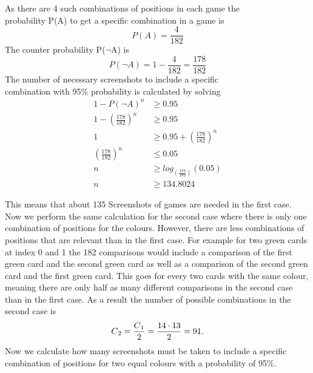 \begin{center}
	As there are 4 such combinations of positions in each game the \\probability P(A) to get a specific combination in a game is 
	\begin{equation*}
	P(A) = \frac{4}{182} %
	\end{equation*}
	The counter probability P($\lnot$A) is 
	\begin{equation*}
	P(\lnot A) = 1 - \frac{4}{182} = \frac{178}{182}%
	\end{equation*}
	The number of necessary screenshots to include a specific \\combination with 95\% probability is calculated by solving
	\begin{align*}
	1 - P(\lnot A)^n &\geq 0.95 \\
	1 - \left(\frac{178}{182}\right)^n &\geq 0.95 \\
	1 &\geq 0.95 + \left(\frac{178}{182}\right)^n\\
	\left(\frac{178}{182}\right)^n &\leq 0.05\\
	n &\geq log_{(\frac{178}{182})}(0.05) \\
	n &\geq 134.8024 %
	\end{align*}
\end{center}
This means that about 135 Screenshots of games are needed in the first case. Now we perform the same calculation for the second case where there is only one combination of positions for the colours. However, there are less combinations of positions that are relevant than in the first case. For example for two green cards at index 0 and 1 the 182 comparisons would include a comparison of the first green card and the second green card as well as a comparison of the second green card and the first green card. This goes for every two cards with the same colour, meaning there are only half as many different comparisons in the second case than in the first case. As a result the number of possible combinations in the second case is
\begin{equation*}
C\textsubscript{2} = \frac{C\textsubscript{1}}{2} = \frac{14 \cdot 13}{2} = 91.
\end{equation*}
Now we calculate how many screenshots must be taken to include a specific combination of positions for two equal colours with a probability of 95\%. 
